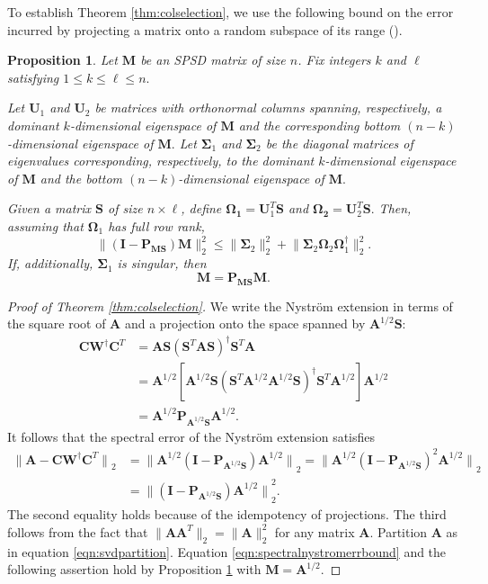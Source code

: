 \documentclass[11pt,letterpaper,twoside,reqno,nosumlimits]{amsart}
\def\pinv{\dagger}
\def\transp{T}
\newcommand{\mat}[1]{\ensuremath{\mathbf{#1}}}
\newcommand{\norm}[1]{\ensuremath{\big\|#1\big\|}}
\newtheorem{prop}{Proposition}
\theoremstyle{remark}
\begin{document}
To establish Theorem \ref{thm:colselection}, we use the following bound on the error incurred by projecting a matrix onto a random subspace of its range (\cite[Theorem 9.1]{HMT11}).

\begin{prop}
 Let $\mat{M}$ be an SPSD matrix of size $n$. Fix integers $k$ and $\ell$ satisfying $1 \leq k \leq \ell \leq n.$ 

Let $\mat{U}_1$ and $\mat{U}_2$ be matrices with orthonormal columns spanning, respectively, a dominant $k$-dimensional eigenspace of $\mat{M}$ and the corresponding bottom $(n-k)$-dimensional eigenspace of $\mat{M}.$ Let $\mat{\Sigma}_1$ and $\mat{\Sigma}_2$ be the diagonal matrices of eigenvalues corresponding, respectively, to the dominant $k$-dimensional eigenspace of $\mat{M}$ and the bottom $(n-k)$-dimensional eigenspace of $\mat{M}.$ 

Given a matrix $\mat{S}$ of size $n \times \ell$, define $\mat{\Omega_1} = \mat{U}_1^\transp \mat{S}$ and $\mat{\Omega_2} = \mat{U}_2^\transp \mat{S}.$ Then, assuming that $\mat{\Omega}_1$ has full row rank,
\[
\| (\mat{I} - \mat{P}_{\mat{M}\mat{S}}) \mat{M} \|_2^2 \leq \| \mat{\Sigma}_2 \|_2^2 + \big\| \mat{\Sigma}_2 \mat{\Omega}_2 \mat{\Omega}_1^\pinv \big \|_2^2.
\]
If, additionally, $\mat{\Sigma}_1$ is singular, then
\[
 \mat{M} = \mat{P}_{\mat{M}\mat{S}}\mat{M}.
\]

 \label{prop:deterministicerrorbound}
\end{prop}

\begin{proof}[Proof of Theorem \ref{thm:colselection}]
We write the Nystr\"om extension in terms of the square root of $\mat{A}$ and a projection onto the space spanned by $\mat{A}^{1/2} \mat{S}:$
\begin{align*}
  \mat{C} \mat{W}^\pinv \mat{C}^\transp & = \mat{A} \mat{S} (\mat{S}^\transp \mat{A} \mat{S})^\pinv \mat{S}^\transp \mat{A} \\
  & = \mat{A}^{1/2} [\mat{A}^{1/2} \mat{S} (\mat{S}^\transp \mat{A}^{1/2} \mat{A}^{1/2} \mat{S})^\pinv \mat{S}^\transp \mat{A}^{1/2}] \mat{A}^{1/2} \\
  & = \mat{A}^{1/2} \mat{P}_{\mat{A}^{1/2} \mat{S}} \mat{A}^{1/2}.
\end{align*}
It follows that the spectral error of the Nystr\"om extension satisfies
\begin{align*}
  \norm{\mat{A} - \mat{C} \mat{W}^\pinv \mat{C}^\transp}_2 & = \norm{\mat{A}^{1/2} ( \mat{I} - \mat{P}_{\mat{A}^{1/2}\mat{S}}) \mat{A}^{1/2}}_2  = \norm{\mat{A}^{1/2} ( \mat{I} - \mat{P}_{\mat{A}^{1/2}\mat{S}})^2 \mat{A}^{1/2}}_2\\ 
 & = \norm{( \mat{I} - \mat{P}_{\mat{A}^{1/2}\mat{S}}) \mat{A}^{1/2}}_2^2.
\end{align*}
The second equality holds because of the idempotency of projections. The third follows from the fact that $\|\mat{A}\mat{A}^\transp\|_2 = \|\mat{A}\|_2^2$ for any matrix $\mat{A}.$ Partition $\mat{A}$ as in equation \eqref{eqn:svdpartition}. Equation \eqref{eqn:spectralnystromerrbound} and the following assertion hold by Proposition \ref{prop:deterministicerrorbound} with $\mat{M} = \mat{A}^{1/2}.$
\end{proof}
\end{document}
